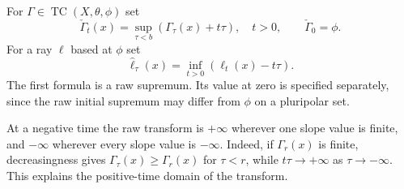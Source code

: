 \begin{definition}\label{def:test-curve-legendre-transform}
For $\Gamma\in\operatorname{TC}(X,\theta,\phi)$ set
\[
 \check\Gamma_t(x)=\sup_{\tau<b}(\Gamma_\tau(x)+t\tau),\quad t>0,
                           \qquad\check\Gamma_0=\phi.
\]
For a ray $\ell$ based at $\phi$ set
\[
 \widehat\ell_\tau(x)=\inf_{t>0}(\ell_t(x)-t\tau).
\]
The first formula is a raw supremum. Its value at zero is specified separately, since the raw initial supremum may differ from $\phi$ on a pluripolar set.
\end{definition}

\begin{remark}\label{rem:test-curve-negative-times}
At a negative time the raw transform is $+\infty$ wherever one slope value is finite, and $-\infty$ wherever every slope value is $-\infty$. Indeed, if $\Gamma_r(x)$ is finite, decreasingness gives $\Gamma_\tau(x)\geq\Gamma_r(x)$ for $\tau<r$, while $t\tau\to+\infty$ as $\tau\to-\infty$. This explains the positive-time domain of the transform.
\end{remark}

